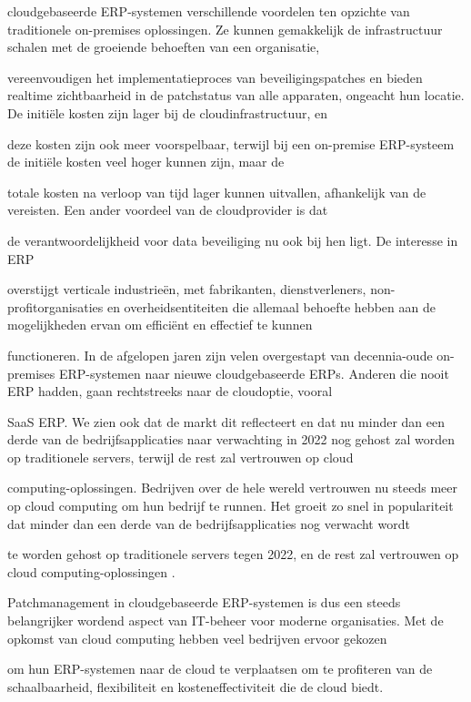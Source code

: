 cloudgebaseerde ERP-systemen verschillende voordelen ten opzichte van traditionele on-premises oplossingen. Ze kunnen gemakkelijk de infrastructuur schalen met de groeiende behoeften van een organisatie, 

vereenvoudigen het implementatieproces van beveiligingspatches en bieden realtime zichtbaarheid in de patchstatus van alle apparaten, ongeacht hun locatie. De initiële kosten zijn lager bij de cloudinfrastructuur, en

deze kosten zijn ook meer voorspelbaar, terwijl bij een on-premise ERP-systeem de initiële kosten veel hoger kunnen zijn, maar de

totale kosten na verloop van tijd lager kunnen uitvallen, afhankelijk van de vereisten. Een ander voordeel van de cloudprovider is dat

de verantwoordelijkheid voor data beveiliging nu ook bij hen ligt. De interesse in ERP

overstijgt verticale industrieën, met fabrikanten, dienstverleners, non-profitorganisaties en overheidsentiteiten die allemaal behoefte hebben aan de mogelijkheden ervan om efficiënt en effectief te kunnen

functioneren. In de afgelopen jaren zijn velen overgestapt van decennia-oude on-premises ERP-systemen naar nieuwe cloudgebaseerde ERPs. Anderen die nooit ERP hadden, gaan rechtstreeks naar de cloudoptie, vooral 

SaaS ERP. We zien ook dat de markt dit reflecteert en dat nu minder dan een derde van de bedrijfsapplicaties naar verwachting in 2022 nog gehost zal worden op traditionele servers, terwijl de rest zal vertrouwen op cloud

computing-oplossingen. Bedrijven over de hele wereld vertrouwen nu steeds meer op cloud computing om hun bedrijf te runnen. Het groeit zo snel in populariteit dat minder dan een derde van de bedrijfsapplicaties nog verwacht wordt 

te worden gehost op traditionele servers tegen 2022, en de rest zal vertrouwen op cloud computing-oplossingen \autocite{Pimentel2017}.

Patchmanagement in cloudgebaseerde ERP-systemen is dus een steeds belangrijker wordend aspect van IT-beheer voor moderne organisaties. Met de opkomst van cloud computing hebben veel bedrijven ervoor gekozen

om hun ERP-systemen naar de cloud te verplaatsen om te profiteren van de schaalbaarheid, flexibiliteit en kosteneffectiviteit die de cloud biedt. 


